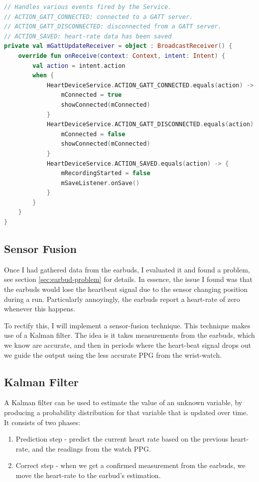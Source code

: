 \documentclass[12pt,a4paper,twoside,openright]{report}
\begin{document}
\begin{lstlisting}[language=Kotlin]
// Handles various events fired by the Service.
// ACTION_GATT_CONNECTED: connected to a GATT server.
// ACTION_GATT_DISCONNECTED: disconnected from a GATT server.
// ACTION_SAVED: heart-rate data has been saved
private val mGattUpdateReceiver = object : BroadcastReceiver() {
    override fun onReceive(context: Context, intent: Intent) {
        val action = intent.action
        when {
            HeartDeviceService.ACTION_GATT_CONNECTED.equals(action) -> {
                mConnected = true
                showConnected(mConnected)
            }
            HeartDeviceService.ACTION_GATT_DISCONNECTED.equals(action) -> {
                mConnected = false
                showConnected(mConnected)
            }
            HeartDeviceService.ACTION_SAVED.equals(action) -> {
                mRecordingStarted = false
                mSaveListener.onSave()
            }
        }
    }
}
\end{lstlisting}


\subsection{Sensor Fusion}

Once I had gathered data from the earbuds, I evaluated it and found a problem,
see section \ref{sec:earbud-problem} for details. In essence, the issue I
found was that the earbuds would lose the heartbeat signal due to the sensor
changing position during a run. Particularly annoyingly, the earbuds report a
heart-rate of zero whenever this happens. 

To rectify this, I will implement a sensor-fusion technique. This technique
makes use of a Kalman filter. The idea is it takes measurements from the earbuds, which
we know are accurate, and then in periods where the heart-beat signal drops
out we guide the output using the less accurate PPG from the wrist-watch.

\subsection{Kalman Filter}

A Kalman filter can be used to estimate the value of an unknown variable, by
producing a probability distribution for that variable that is updated over
time.
It consists of two phases:
\begin{enumerate}
	\item Prediction step - predict the current heart rate based on the
		previous heart-rate, and the readings from the watch PPG.

	\item Correct step - when we get a confirmed measurement from the
		earbuds, we move the heart-rate to the earbud's estimation.
\end{enumerate}
\end{document}
